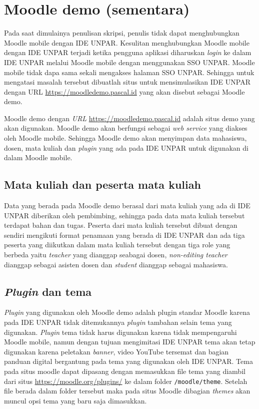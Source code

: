 
\section{Moodle demo (sementara)}

Pada saat dimulainya penulisan skripsi, penulis tidak dapat menghubungkan Moodle mobile dengan IDE UNPAR. Kesulitan menghubungkan Moodle mobile dengan IDE UNPAR terjadi ketika pengguna aplikasi diharuskan \textit{login} ke dalam IDE UNPAR melalui Moodle mobile dengan menggunakan SSO UNPAR. Moodle mobile tidak dapa sama sekali mengakses halaman SSO UNPAR. Sehingga untuk mengatasi masalah tersebut dibuatlah situs untuk mensimulasikan IDE UNPAR dengan URL \url{https://moodledemo.pascal.id} yang akan disebut sebagai Moodle demo.

Moodle demo dengan \textit{URL} \url{https://moodledemo.pascal.id} adalah situs demo yang akan digunakan. Moodle demo akan berfungsi sebagai \textit{web service} yang diakses oleh Moodle mobile. Sehingga Moodle demo akan menyimpan data mahasiswa, dosen, mata kuliah dan \textit{plugin} yang  ada pada IDE UNPAR untuk digunakan di dalam Moodle mobile. 
\subsection{Mata kuliah dan peserta mata kuliah}

Data yang berada pada Moodle demo berasal dari mata kuliah yang ada di IDE UNPAR diberikan oleh pembimbing, sehingga pada data mata kuliah tersebut terdapat bahan dan tugas. Peserta dari mata kuliah tersebut dibuat dengan sendiri mengikuti format penamaan yang berada di IDE UNPAR dan ada tiga peserta yang diikutkan dalam mata kuliah tersebut dengan tiga role yang berbeda yaitu \textit{teacher} yang dianggap seabagai dosen, \textit{non-editing teacher} dianggap sebagai asisten dosen dan \textit{student} dianggap sebagai mahasiswa.

\subsection{\textit{Plugin} dan tema}

\textit{Plugin} yang digunakan oleh Moodle demo adalah plugin standar Moodle karena pada IDE UNPAR tidak ditemukannya \textit{plugin} tambahan selain tema yang digunakan. \textit{Plugin} tema tidak harus digunakan karena tidak mempengaruhi Moodle mobile, namun dengan tujuan mengimitasi IDE UNPAR tema akan tetap digunakan karena peletakan \textit{banner}, video YouTube tersemat dan bagian panduan digital bergantung pada tema yang digunakan oleh IDE UNPAR. Tema pada situs moodle dapat dipasang dengan memasukkan file tema yang diambil dari situs \url{https://moodle.org/plugins/} ke dalam folder \texttt{/moodle/theme}. Setelah file berada dalam folder tersebut maka pada situs Moodle dibagian \textit{themes} akan muncul opsi tema yang baru saja dimasukkan.

